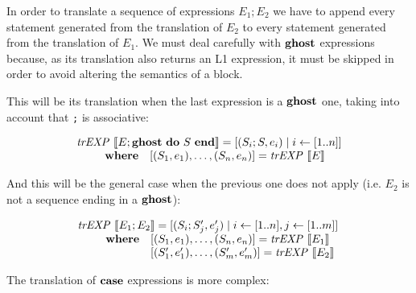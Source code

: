 In order to translate a sequence of expressions $E_1;E_2$ we have to append 
every statement generated from the translation of $E_2$ to every statement 
generated from the translation of $E_1$. We must deal carefully with $\textbf{ghost}$
expressions because, as its translation also returns an L1 expression, it must
be skipped in order to avoid altering the semantics of a block.

This will be its translation when the last expression is a $\textbf{ghost}$ one, taking
into account that \verb|;| is associative:

\[
\begin{array}{l}
\mathit{trEXP}~\llbracket E;\textbf{ghost}~\textbf{do}~S~\textbf{end}\rrbracket = [(S_i;S,e_i) \mid i \leftarrow [1..n]] \\
\qquad 
\begin{array}{ll}
\textbf{where} & [(S_1,e_1),\dots,(S_n, e_n)] = \mathit{trEXP}~\llbracket E\rrbracket \\
\end{array}
\end{array}
\]

And this will be the general case when the previous one does not apply (i.e.
$E_2$ is not a sequence ending in a $\textbf{ghost}$):

\[
\begin{array}{l}
\mathit{trEXP}~\llbracket E_1;E_2\rrbracket = [(S_i;S_j',e'_j) \mid i \leftarrow [1..n], j \leftarrow [1..m]] \\
\qquad 
\begin{array}{ll}
\textbf{where} & [(S_1,e_1),\dots,(S_n, e_n)] = \mathit{trEXP}~\llbracket E_1\rrbracket \\
& [(S_1',e'_1),\dots,(S_m', e'_m)] = \mathit{trEXP}~\llbracket E_2\rrbracket \\
\end{array}
\end{array}
\]

The translation of $\textbf{case}$ expressions is more complex:

